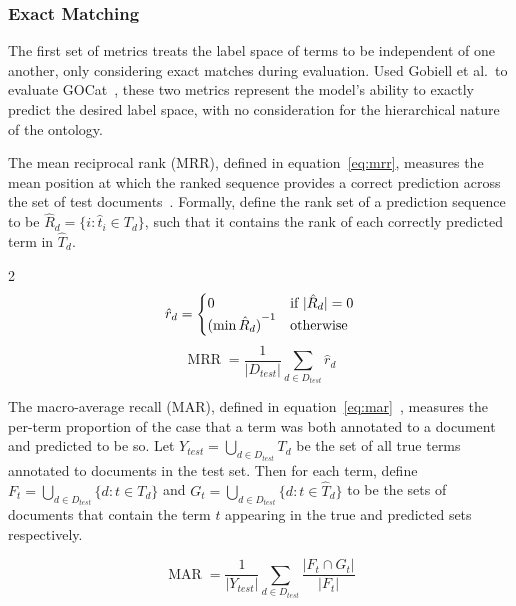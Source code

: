 \documentclass[11pt]{article}
\theoremstyle{plain}
\theoremstyle{definition}
\begin{document}
\subsubsection{Exact Matching}\label{sec:methods-metrics-exact}

The first set of metrics treats the label space of terms to be independent of one another, only considering exact matches during evaluation. Used Gobiell et al.\ to evaluate GOCat~\cite{gobeill/2013/managing}, these two metrics represent the model's ability to exactly predict the desired label space, with no consideration for the hierarchical nature of the ontology.

The mean reciprocal rank (MRR), defined in equation~\ref{eq:mrr}, measures the mean position at which the ranked sequence provides a correct prediction across the set of test documents~\cite{radev/2002/evaluating}. Formally, define the rank set of a prediction sequence to be $\hat{R}_d = \{  i : \hat{t}_i \in T_d \}$, such that it contains the rank of each correctly predicted term in $\hat{T}_d$.

\begin{multicols}{2}
    \begin{equation}\label{eq:rr}
        \hat{r}_d =
        \begin{cases}
            0                      & \textnormal{if } |\hat{R}_d| = 0 \\
            {(\min\hat{R}_d)}^{-1} & \textnormal{otherwise}
        \end{cases}
    \end{equation}
    \break{}
    \begin{equation}\label{eq:mrr}
        \operatorname{MRR} = \frac{1}{|D_{test}|} \sum_{d \in D_{test}} \hat{r}_d
    \end{equation}
\end{multicols}

The macro-average recall (MAR), defined in equation~\ref{eq:mar}~\cite{sokolova/2009/systematic}, measures the per-term proportion of the case that a term was both annotated to a document and predicted to be so. Let $Y_{test} = \bigcup_{d \in D_{test}} T_d$ be the set of all true terms annotated to documents in the test set. Then for each term, define $F_t = \bigcup_{d \in D_{test}} \{d : t \in T_d\}$ and $G_t = \bigcup_{d \in D_{test}} \{d : t \in \hat{T}_d\}$ to be the sets of documents that contain the term $t$ appearing in the true and predicted sets respectively.

\begin{equation}
    \operatorname{MAR} = \frac{1}{|Y_{test}|} \sum_{d \in D_{test}} \frac{|F_t \cap G_t|}{|F_t|}
    \label{eq:mar}
\end{equation}
\end{document}
